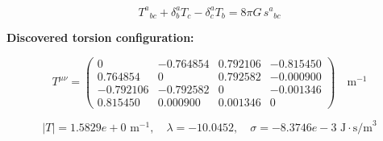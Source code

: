 
\begin{equation}
  T^a{}_{bc} + \delta^a_b T_c - \delta^a_c T_b = 8\pi G \, s^a{}_{bc}
\end{equation}

\textbf{Discovered torsion configuration:}

\begin{equation}
  T^{\mu\nu} = \begin{pmatrix}
    0 & -0.764854 & 0.792106 & -0.815450 \\
    0.764854 & 0 & 0.792582 & -0.000900 \\
    -0.792106 & -0.792582 & 0 & -0.001346 \\
    0.815450 & 0.000900 & 0.001346 & 0
  \end{pmatrix} \quad \text{m}^{-1}
\end{equation}

\begin{equation}
  |T| = 1.5829e+0 \text{ m}^{-1}, \quad
  \lambda = -10.0452, \quad
  \sigma = -8.3746e-3 \text{ J}\cdot\text{s/m}^3
\end{equation}